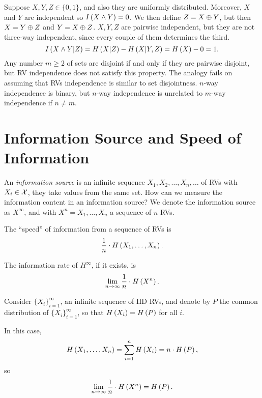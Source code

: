 Suppose $X, Y, Z \in \{0, 1\}$, and also they are uniformly distributed.
Moreover, $X$ and $Y$ are independent so $I \left( {X \land Y} \right) = 0$.
We then define $Z = X \oplus Y$, but then $X = Y \oplus Z$ and $Y = X \oplus Z$.
$X, Y, Z$ are pairwise independent, but they are not three-way independent, since every couple of them determines the third.
\begin{equation*}
	I \left( {X \land Y | Z} \right)
	=
	H\left({X | Z}\right) - H\left({X | Y, Z}\right)
	=
	H\left({X}\right) - 0
	= 1.
\end{equation*}
Any number $m \ge 2$ of sets are disjoint if and only if they are pairwise disjoint, but \ac{RV} independence does not satisfy this property.
The analogy fails on assuming that \acp{RV} independence is similar to set disjointness.
$n$-way independence is binary, but $n$-way independence is unrelated to $m$-way independence if $n \neq m$.

\section{Information Source and Speed of Information}

An \emph{information source} is an infinite sequence $X_1, X_2, \dots, X_n, \dots$ of \acp{RV} with $X_i \in \mathcal{X}$, \ie they take values from the same set.
How can we measure the information content in an information source?
We denote the information source as $X^\infty$, and with $X^n = X_1, \dots, X_n$ a sequence of $n$ \acp{RV}.

The ``speed'' of information from a sequence of \acp{RV} is 
\begin{equation*}
	\frac{1}{n} \cdot H\left({X_1, \dots, X_n}\right).
\end{equation*}

The information rate of $H^\infty$, if it exists, is
\begin{equation*}
	\lim_{n \to \infty} \frac{1}{n} \cdot H\left({X^n}\right). 
\end{equation*}


Consider $\{X_i\}_{i = 1}^\infty$, an infinite sequence of \ac{IID} \acp{RV}, and denote by $P$ the common distribution of $\{X_i\}_{i = 1}^\infty$, so that $H\left({X_i}\right) = H\left({P}\right)$ for all $i$.

In this case,
\begin{equation*}
	H\left({X_1, \dots, X_n}\right) =
	\sum_{i = 1}^n H\left({X_i}\right) =
	n \cdot H\left({P}\right),
\end{equation*}
so
\begin{equation*}
	\lim_{n \to \infty} \frac{1}{n} \cdot H\left({X^n}\right) = H\left({P}\right).
\end{equation*}

